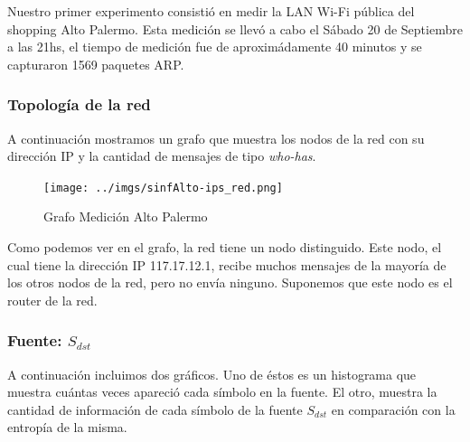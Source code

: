 \documentclass[10pt, a4paper]{article}
\begin{document}
Nuestro primer experimento consistió en medir la LAN Wi-Fi pública del shopping Alto Palermo. Esta medición se llevó a cabo el Sábado 20 de Septiembre a las 21hs, el tiempo de medición fue de aproximádamente 40 minutos y se capturaron 1569 paquetes ARP.


\subsubsection{Topología de la red}

A continuación mostramos un grafo que muestra los nodos de la red con su dirección IP y la cantidad de mensajes de tipo \emph{who-has}.

\begin{figure}[H]
 \begin{center}
  \texttt{[image: ../imgs/sinfAlto-ips\_red.png]}
  \caption{Grafo Medición Alto Palermo}
 \end{center}

\end{figure}

Como podemos ver en el grafo, la red tiene un nodo distinguido. Este nodo, el cual tiene la dirección IP 117.17.12.1, recibe muchos mensajes de la mayoría de los otros nodos de la red, pero no envía ninguno. Suponemos que este nodo es el router de la red.

\subsubsection{Fuente: $S_{dst}$}

A continuación incluimos dos gráficos. Uno de éstos es un histograma que muestra cuántas veces apareció cada símbolo en la fuente. El otro, muestra la cantidad de información de cada símbolo de la fuente $S_{dst}$ en comparación con la entropía de la misma. 
\end{document}
